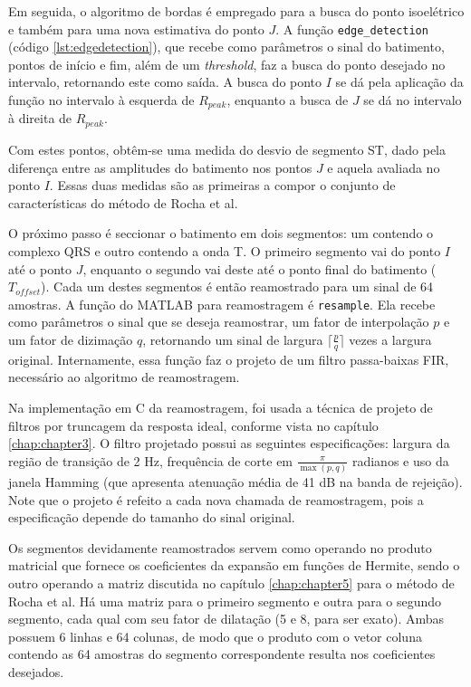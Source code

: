 Em seguida, o algoritmo de bordas é empregado para a busca do ponto isoelétrico e também para uma nova estimativa do ponto $J$. A função \texttt{edge\_detection} (código \ref{lst:edgedetection}), que recebe como parâmetros o sinal do batimento, pontos de início e fim, além de um \emph{threshold}, faz a busca do ponto desejado no intervalo, retornando este como saída. A busca do ponto $I$ se dá pela aplicação da função no intervalo à esquerda de $R_{peak}$, enquanto a busca de $J$ se dá no intervalo à direita de $R_{peak}$.

Com estes pontos, obtêm-se uma medida do desvio de segmento ST, dado pela diferença entre as amplitudes do batimento nos pontos $J$ e aquela avaliada no ponto $I$. Essas duas medidas são as primeiras a compor o conjunto de características do método de Rocha et al.

O próximo passo é seccionar o batimento em dois segmentos: um contendo o complexo QRS e outro contendo a onda T. O primeiro segmento vai do ponto $I$ até o ponto $J$, enquanto o segundo vai deste até o ponto final do batimento ($T_{offset}$). Cada um destes segmentos é então reamostrado para um sinal de 64 amostras. A função do MATLAB para reamostragem é \texttt{resample}. Ela recebe como parâmetros o sinal que se deseja reamostrar, um fator de interpolação $p$ e um fator de dizimação $q$, retornando um sinal de largura $\lceil\frac{p}{q}\rceil$ vezes a largura original. Internamente, essa função faz o projeto de um filtro passa-baixas FIR, necessário ao algoritmo de reamostragem.

Na implementação em C da reamostragem, foi usada a técnica de projeto de filtros por truncagem da resposta ideal, conforme vista no capítulo \ref{chap:chapter3}. O filtro projetado possui as seguintes especificações: largura da região de transição de 2 Hz, frequência de corte em $\frac{\pi}{\max\left(p,q\right)}$ radianos e uso da janela Hamming (que apresenta atenuação média de 41 dB na banda de rejeição). Note que o projeto é refeito a cada nova chamada de reamostragem, pois a especificação depende do tamanho do sinal original.

Os segmentos devidamente reamostrados servem como operando no produto matricial que fornece os coeficientes da expansão em funções de Hermite, sendo o outro operando a matriz discutida no capítulo \ref{chap:chapter5} para o método de Rocha et al. Há uma matriz para o primeiro segmento e outra para o segundo segmento, cada qual com seu fator de dilatação (5 e 8, para ser exato). Ambas possuem 6 linhas e 64 colunas, de modo que o produto com o vetor coluna contendo as 64 amostras do segmento correspondente resulta nos coeficientes desejados.

